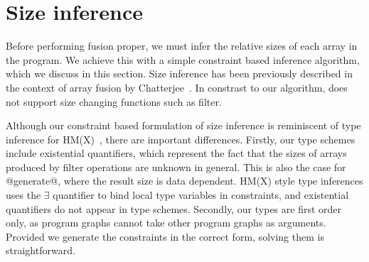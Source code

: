 \section{Size inference}
Before performing fusion proper, we must infer the relative sizes of each array in the program. We achieve this with a simple constraint based inference algorithm, which we discuss in this section. Size inference has been previously described in the context of array fusion by Chatterjee~\cite{chatterjee1991size}. In constrast to our algorithm, \cite{chatterjee1991size} does not support size changing functions such as filter.

Although our constraint based formulation of size inference is reminiscent of type inference for HM(X)~\cite{odersky1999type}, there are important differences. Firstly, our type schemes include existential quantifiers, which represent the fact that the sizes of arrays produced by filter operations are unknown in general. This is also the case for @generate@, where the result size is data dependent. HM(X) style type inferences uses the $\exists$ quantifier to bind local type variables in constraints, and existential quantifiers do not appear in type schemes. Secondly, our types are first order only, as program graphs cannot take other program graphs as arguments. Provided we generate the constraints in the correct form, solving them is straightforward.




